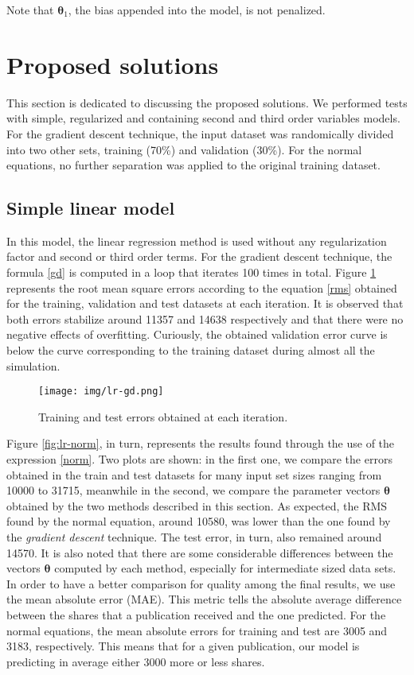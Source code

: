\documentclass[10pt,twocolumn,letterpaper]{article}
\begin{document}
Note that \(\bm {\theta}_1 \), the bias appended into the model, is not penalized.

\section{Proposed solutions}

This section is dedicated to discussing the proposed solutions. We performed tests with simple, regularized and containing second and third order variables models. For the gradient descent technique, the input dataset was randomically divided into two other sets, training (70\%) and validation (30\%). For the normal equations, no further separation was applied to the original training dataset.

\subsection {Simple linear model}

In this model, the linear regression method is used without any regularization factor and second or third order terms. For the gradient descent technique, the formula \ref {gd} is computed in a loop that iterates 100 times in total. Figure \ref {fig:lr-gd} represents the root mean square errors according to the equation \ref{rms} obtained for the training, validation and  test datasets at each iteration. It is observed that both errors stabilize around 11357 and 14638 respectively and that there were no negative effects of overfitting. Curiously, the obtained validation error curve is below the curve corresponding to the training dataset during almost all the simulation.

\begin{figure}
    \centering
    \texttt{[image: img/lr-gd.png]}
    \caption{Training and test errors obtained at each iteration.}
    \label{fig:lr-gd}
\end{figure}

Figure \ref{fig:lr-norm}, in turn, represents the results found through the use of the expression \ref{norm}. Two plots are shown: in the first one, we compare the errors obtained in the train and test datasets for many input set sizes ranging from 10000 to 31715, meanwhile in the second, we compare the parameter vectors \(\bm{\theta}\) obtained by the two methods described in this section. As expected, the RMS found by the normal equation, around 10580, was lower than the one found by the \textit {gradient descent} technique. The test error, in turn, also remained around 14570. It is also noted that there are some considerable differences between the vectors \(\bm{\theta}\) computed by each method, especially for intermediate sized data sets. In order to have a better comparison for quality among the final results, we use the mean absolute error (MAE). This metric tells the absolute average difference between the shares that a publication received and the one predicted. For the normal equations, the mean absolute errors for training and test are 3005 and 3183, respectively. This means that for a given publication, our model is predicting in average either 3000 more or less shares.
\end{document}
